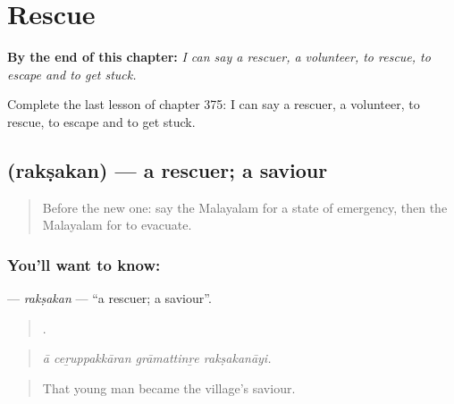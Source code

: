
\chapter{Rescue}
\label{ch:ml-rescue}

\begin{chapteropening}
\textbf{By the end of this chapter:} \emph{I can say a rescuer, a volunteer, to rescue, to escape and to get stuck.}

Complete the last lesson of chapter 375: I can say a rescuer, a volunteer, to rescue, to escape and to get stuck.
\end{chapteropening}

\section[\texorpdfstring{\ml{രക്ഷകൻ} (rakṣakan)}{രക്ഷകൻ (rakṣakan)}]{ (rakṣakan) — a rescuer; a saviour}

\label{lesson:ML-C375-raksakan}



\begin{quote}
Before the new one: say the Malayalam for a state of emergency, then the Malayalam for to evacuate.
\end{quote}

\subsection*{You'll want to know: }
\textbf{} — \emph{rakṣakan} — \textquotedblleft{}a rescuer; a saviour\textquotedblright{}.

\begin{quote}
   .
\end{quote}

\begin{quote}
\emph{ā ceṟuppakkāran grāmattinṟe rakṣakanāyi.}
\end{quote}

\begin{quote}
That young man became the village's saviour.
\end{quote}

